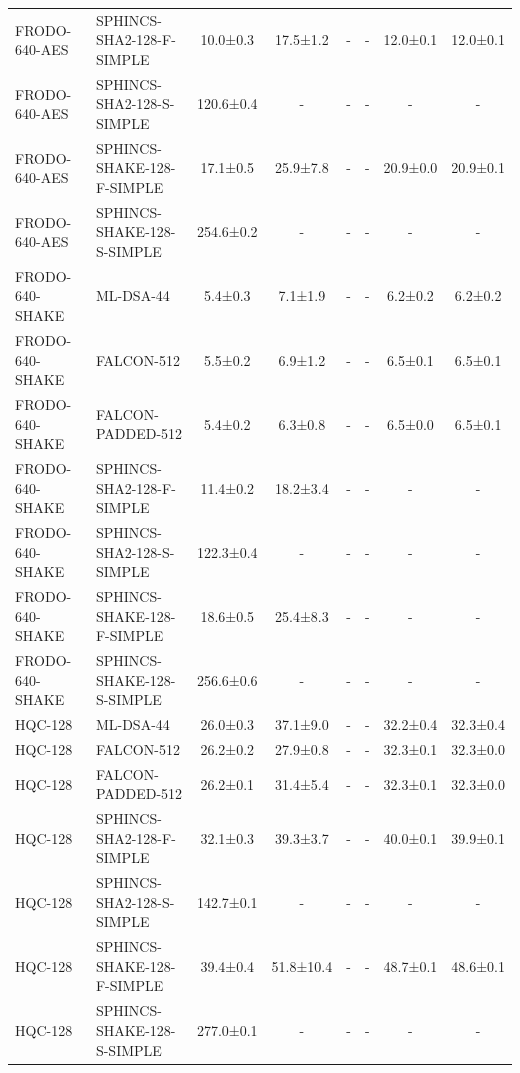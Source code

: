 \documentclass[10pt]{article}
\begin{document}
\begin{tabular}{@{}l l c c c c c c@{}}
FRODO-640-AES & SPHINCS-SHA2-128-F-SIMPLE & 10.0±0.3 & 17.5±1.2 & - & - & 12.0±0.1 & 12.0±0.1 \\
FRODO-640-AES & SPHINCS-SHA2-128-S-SIMPLE & 120.6±0.4 & - & - & - & - & - \\
FRODO-640-AES & SPHINCS-SHAKE-128-F-SIMPLE & 17.1±0.5 & 25.9±7.8 & - & - & 20.9±0.0 & 20.9±0.1 \\
FRODO-640-AES & SPHINCS-SHAKE-128-S-SIMPLE & 254.6±0.2 & - & - & - & - & - \\
FRODO-640-SHAKE & ML-DSA-44 & 5.4±0.3 & 7.1±1.9 & - & - & 6.2±0.2 & 6.2±0.2 \\
FRODO-640-SHAKE & FALCON-512 & 5.5±0.2 & 6.9±1.2 & - & - & 6.5±0.1 & 6.5±0.1 \\
FRODO-640-SHAKE & FALCON-PADDED-512 & 5.4±0.2 & 6.3±0.8 & - & - & 6.5±0.0 & 6.5±0.1 \\
FRODO-640-SHAKE & SPHINCS-SHA2-128-F-SIMPLE & 11.4±0.2 & 18.2±3.4 & - & - & - & - \\
FRODO-640-SHAKE & SPHINCS-SHA2-128-S-SIMPLE & 122.3±0.4 & - & - & - & - & - \\
FRODO-640-SHAKE & SPHINCS-SHAKE-128-F-SIMPLE & 18.6±0.5 & 25.4±8.3 & - & - & - & - \\
FRODO-640-SHAKE & SPHINCS-SHAKE-128-S-SIMPLE & 256.6±0.6 & - & - & - & - & - \\
HQC-128 & ML-DSA-44 & 26.0±0.3 & 37.1±9.0 & - & - & 32.2±0.4 & 32.3±0.4 \\
HQC-128 & FALCON-512 & 26.2±0.2 & 27.9±0.8 & - & - & 32.3±0.1 & 32.3±0.0 \\
HQC-128 & FALCON-PADDED-512 & 26.2±0.1 & 31.4±5.4 & - & - & 32.3±0.1 & 32.3±0.0 \\
HQC-128 & SPHINCS-SHA2-128-F-SIMPLE & 32.1±0.3 & 39.3±3.7 & - & - & 40.0±0.1 & 39.9±0.1 \\
HQC-128 & SPHINCS-SHA2-128-S-SIMPLE & 142.7±0.1 & - & - & - & - & - \\
HQC-128 & SPHINCS-SHAKE-128-F-SIMPLE & 39.4±0.4 & 51.8±10.4 & - & - & 48.7±0.1 & 48.6±0.1 \\
HQC-128 & SPHINCS-SHAKE-128-S-SIMPLE & 277.0±0.1 & - & - & - & - & - \\
\bottomrule
\end{tabular}
\end{document}
